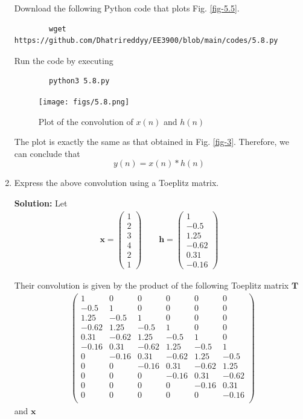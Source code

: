 \documentclass[journal,12pt,twocolumn]{IEEEtran}
\newcommand{\solution}{\noindent \textbf{Solution: }}
\let\vec\mathbf
\numberwithin{equation}{section}
\renewcommand\thesection{\arabic{section}}
\newcommand{\myvec}[1]{\ensuremath{\begin{pmatrix}#1\end{pmatrix}}}
\begin{document}
\begin{enumerate}[label=\thesection.\arabic*]
	Download the following Python code that plots Fig. \ref{fig-5.5}.
	\begin{lstlisting}
		wget https://github.com/Dhatrireddyy/EE3900/blob/main/codes/5.8.py
	\end{lstlisting}
	
	Run the code by executing
	\begin{lstlisting}
		python3 5.8.py
	\end{lstlisting}

	\begin{figure}[!ht]
		\centering
		\texttt{[image: figs/5.8.png]}
		\caption{Plot of the convolution of $x(n)$ and $h(n)$}
		\label{fig-5.8}	
	\end{figure}
	
	The plot is exactly the same as that obtained in Fig. \ref{fig-3}. Therefore, we can conclude that
	\begin{equation}
		y(n) = x(n)*h(n) 
	\end{equation}
	
	\item Express the above convolution using a Toeplitz matrix.
	
	\solution Let 
	\begin{align}
		\vec{x} = \myvec{1 \\ 2 \\ 3 \\ 4 \\ 2 \\ 1} \qquad
		\vec{h} = \myvec{1 \\ -0.5 \\ 1.25 \\ -0.62 \\ 0.31 \\ -0.16}
	\end{align}
	
	Their convolution is given by the product of the following Toeplitz matrix $\vec{T}$
	\begin{align}
		&\myvec{
			1 & 0 & 0 & 0 & 0 & 0 \\
			-0.5 & 1 & 0 & 0 & 0 & 0 \\
			1.25 & -0.5 & 1 & 0 & 0 & 0 \\
			-0.62 & 1.25 & -0.5 & 1 & 0 & 0 \\
			0.31 & -0.62 & 1.25 & -0.5 & 1 & 0 \\
			-0.16 & 0.31 & -0.62 & 1.25 & -0.5 & 1 \\
			0 & -0.16 & 0.31 & -0.62 & 1.25 & -0.5 \\
			0 & 0 & -0.16 & 0.31 & -0.62 & 1.25 \\
			0 & 0 & 0 & -0.16 & 0.31 & -0.62 \\
			0 & 0 & 0 & 0 & -0.16 & 0.31 \\
			0 & 0 & 0 & 0 & 0 & -0.16 \\
		} 
	\end{align}
	and $\vec{x}$
	

\end{enumerate}
\end{document}

